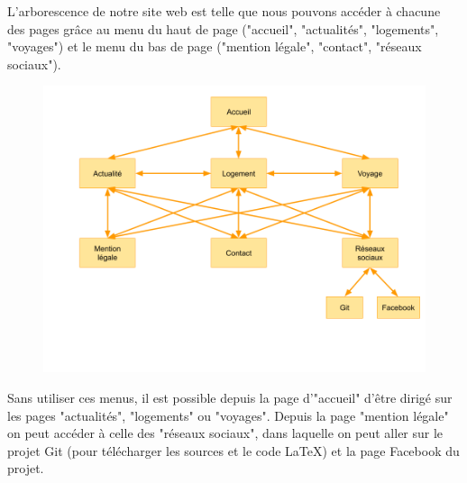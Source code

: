 L'arborescence de notre site web est telle que nous pouvons accéder à chacune des pages grâce au menu du haut de page ("accueil", "actualités", "logements", "voyages") et le menu du bas de page ("mention légale", "contact", "réseaux sociaux").

\begin{figure}[h]
    \centering
    \includegraphics[scale=0.5]{arbo.png}
\end{figure}

Sans utiliser ces menus, il est possible depuis la page d'"accueil" d'être dirigé sur les pages "actualités", "logements" ou "voyages".
Depuis la page "mention légale" on peut accéder à celle des "réseaux sociaux", dans laquelle on peut aller sur le projet Git (pour télécharger les sources et le code LaTeX) et la page Facebook du projet. 

